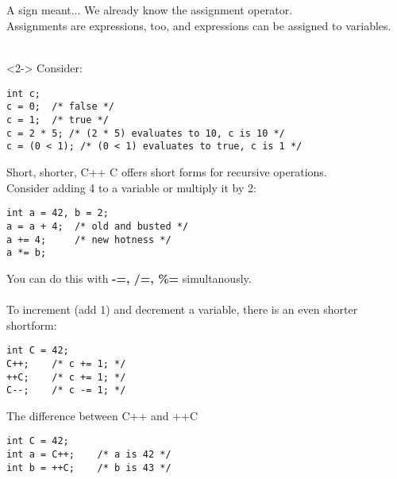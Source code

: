 \subsection{}
\begin{frame}[fragile]{A sign meant...}
	We already know the assignment operator.\\
	Assignments are expressions, too, and expressions can be assigned to variables.\\\ \\
	
	\begin{uncoverenv}<2->
		Consider:
		\begin{lstlisting}[numbers=none]
int c;
c = 0;	/* false */
c = 1;	/* true */
c = 2 * 5; /* (2 * 5) evaluates to 10, c is 10 */
c = (0 < 1); /* (0 < 1) evaluates to true, c is 1 */
\end{lstlisting}
	\end{uncoverenv}
\end{frame}
\begin{frame}[fragile]{Short, shorter, C++}
	C offers short forms for recursive operations.\\
	Consider adding 4 to a variable or multiply it by 2:
	\begin{lstlisting}[numbers=none]
int a = 42, b = 2;
a = a + 4;	/* old and busted */
a += 4;		/* new hotness */
a *= b;
\end{lstlisting}
	You can do this with \textbf{-=, /=, \%=} simultanously.\\
	\ \\To increment (add 1) and decrement a variable, there is an even shorter shortform:
	\begin{lstlisting}[numbers=none]
int C = 42;
C++;	/* c += 1; */
++C;	/* c += 1; */
C--;	/* c -= 1; */
\end{lstlisting}
\end{frame}
\begin{frame}[fragile]{The difference between C++ and ++C}
	\begin{lstlisting}[numbers=none]
int C = 42;
int a = C++;	/* a is 42 */
int b = ++C;	/* b is 43 */
\end{lstlisting}
\end{frame}

